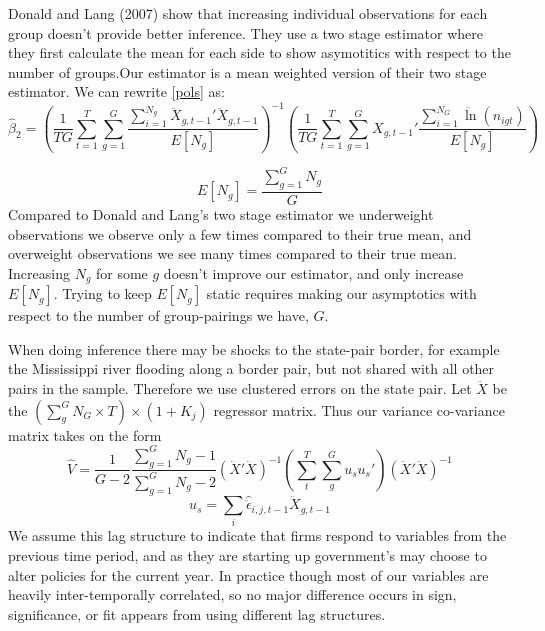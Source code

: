 Donald and Lang (2007) show that increasing individual observations for each group doesn't provide better inference. They use a two stage estimator where they first calculate the mean for each side to show asymotitics with respect to the number of groups.Our estimator is a mean weighted version of their two stage estimator. We can rewrite \ref{pols} as:
\begin{equation}\label{pols_2s}
\hat \beta_{2} = \left(\frac{1}{TG} \sum_{t=1}^{T}\sum_{g=1}^{G}\frac{\sum_{i=1}^{N_{g}}\ddot X_{g,t-1}'\ddot X_{g,t-1}}{E[N_{g}]}\right)^{-1}\left(\frac{1}{TG}\sum_{t=1}^{T}\sum_{g=1}^{G}X_{g,t-1}'\frac{\sum_{i=1}^{N_{G}}\ddot \ln(n_{igt})}{E[N_{g}]}\right)
\end{equation}

\begin{equation}
E[N_{g}] = \frac{\sum_{g=1}^{G}N_{g}}{G}
\end{equation}
Compared to Donald and Lang's two stage estimator we underweight observations we observe only a few times compared to their true mean, and overweight observations we see many times compared to their true mean. Increasing $N_{g}$ for some $g$ doesn't improve our estimator, and only increase $E[N_{g}]$. Trying to keep $E[N_{g}]$ static requires making our asymptotics with respect to the number of group-pairings we have, $G$.

When doing inference there may be shocks to the state-pair border, for example the Mississippi river flooding along a border pair, but not shared with all other pairs in the sample. Therefore we use clustered errors on the state pair. Let $\ddot X$ be the $(\sum_{g}^{G}N_{G} \times T) \times (1+K_{j}) $ regressor matrix. Thus our variance co-variance matrix takes on the form
\begin{equation}\label{var}
\hat V =\frac{1}{G-2}\frac{\sum_{g=1}^{G}N_{g}-1}{\sum_{g=1}^{G}N_{g}-2}(\ddot X'\ddot X)^{-1}(\sum_{t}^{T}\sum_{g}^{G}u_{s}u_{s}')(\ddot X'\ddot X)^{-1}
\end{equation}
\begin{equation}\label{error}
u_{s} = \sum_{i}\hat \ddot \epsilon_{i,j,t-1}\ddot X_{g,t-1}
\end{equation}
We assume this lag structure to indicate that firms respond to variables from the previous time period, and as they are starting up government's may choose to alter policies for the current year. In practice though most of our variables are heavily inter-temporally correlated, so no major difference occurs in sign, significance, or fit appears from using different lag structures.

